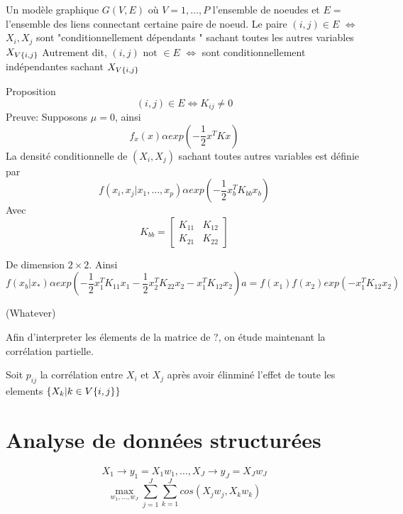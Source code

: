 \documentclass{article}
\begin{document}
Un mod\`ele graphique $G(V,E)$ o\`u $V={1,\ldots,P}$ l'ensemble de noeudes et $E=$ l'ensemble des liens connectant certaine paire de noeud. Le paire $(i,j)\in E$ $\Leftrightarrow$ $X_i,X_j$ sont "conditionnellement d\'ependants " sachant toutes les autres variables $X_{V\\ \{i,j\}}$
Autrement dit, $(i,j) \text{ not }\in E$ $\Leftrightarrow$ sont conditionnellement ind\'ependantes sachant $X_{V\\ \{i,j\}}$

Proposition
\begin{equation}
(i,j) \in E \Leftrightarrow K_{ij}\neq 0
\end{equation}
Preuve: Supposons $\mu=0$, ainsi
\begin{equation}
f_x(x)\alpha exp(-\frac{1}{2}x^TKx)
\end{equation}
La densit\'e conditionnelle de $(X_i,X_j)$ sachant toutes autres variables est d\'efinie par
\begin{equation}
f(x_i,x_j|x_1,\dots,x_p)\alpha exp(-\frac{1}{2}x_b^TK_{bb}x_b)
\end{equation}
Avec
\begin{equation}
K_{bb}=\begin{bmatrix}
K_{11} & K_{12}\\
K_{21} & K_{22}
\end{bmatrix}
\end{equation}

De dimension $2\times2$.
Ainsi
\begin{equation}
f(x_b|x_*)\alpha exp(-\frac{1}{2}x_1^TK_{11}x_1-\frac{1}{2}x_2^TK_{22}x_2-x_1^TK_{12}x_2)a=f(x_1)f(x_2)exp(-x_1^TK_{12}x_2)
\end{equation}

(Whatever)

Afin d'interpreter les \'elements de la matrice de ?, on \'etude maintenant la corr\'elation partielle.

Soit $p_{ij}$ la corr\'elation entre $X_i$ et $X_j$ apr\`es avoir \'elinmin\'e l'effet de toute les elements $\{X_k|k\in V\\ \{i,j\}\}$

\section{Analyse de donn\'ees structur\'ees}

\begin{equation}
X_1\to y_1=X_1w_1,\ldots,X_J\to y_J=X_Jw_J
\end{equation}
\begin{equation}
\max_{w_1,\ldots,w_J}\sum_{j=1}^J\sum_{k=1}^J cos(X_jw_j, X_kw_k)
\end{equation}
\end{document}
